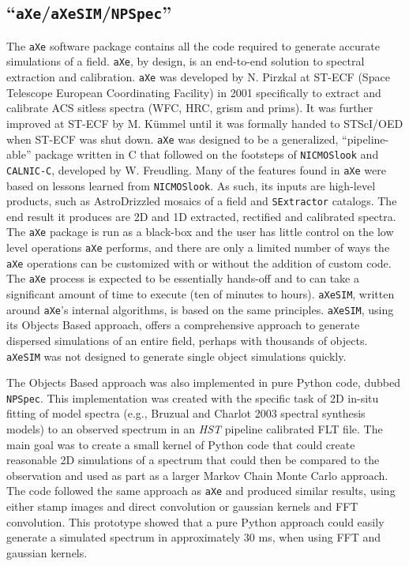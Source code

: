 \documentclass[preprint]{aastex}
\begin{document}
\subsection{``\texttt{aXe}/\texttt{aXeSIM}/\texttt{NPSpec}''} \label{sec:npspec}
The \texttt{aXe} software package contains all the code required to generate accurate simulations of a field. \texttt{aXe}, by design, is an end-to-end solution to spectral extraction and calibration. 
\texttt{aXe} was developed by N. Pirzkal at ST-ECF (Space Telescope European Coordinating Facility) in 2001 specifically to extract and calibrate ACS sitless spectra (WFC, HRC, grism and prims). It was further improved at ST-ECF by M. K\"{u}mmel until it was formally handed to STScI/OED  when ST-ECF was shut down. \texttt{aXe} was designed to be a generalized, ``pipeline-able'' package written in C that followed on the footsteps of \texttt{NICMOSlook} and \texttt{CALNIC-C}, developed by W. Freudling. Many of the features found in \texttt{aXe} were based on lessons learned from \texttt{NICMOSlook}.
As such, its inputs are high-level products, such as AstroDrizzled mosaics of a field and \texttt{SExtractor} catalogs. The end result it produces are 2D and 1D extracted, rectified and calibrated spectra. The \texttt{aXe} package is run as a black-box and the user has little control on the low level operations \texttt{aXe} performs, and there are only a limited number of ways the \texttt{aXe} operations can be customized with or without the addition of custom code. The \texttt{aXe} process is expected to be essentially hands-off and to can take a significant amount of time to execute (ten of minutes to hours).  \texttt{aXeSIM}, written around  \texttt{aXe}'s internal algorithms, is based on the same principles. \texttt{aXeSIM}, using its Objects Based approach, offers a comprehensive approach to generate dispersed simulations of an entire field, perhaps with thousands of objects.  \texttt{aXeSIM} was not designed to generate single object simulations quickly.

The Objects Based approach was also implemented in pure Python code, dubbed \texttt{NPSpec}. This implementation was created with the specific task of 2D in-situ fitting of model spectra (e.g., Bruzual and Charlot 2003 spectral synthesis models) to an observed spectrum in an \textit{HST} pipeline calibrated FLT file. The main goal was to create a small kernel of Python code that could create reasonable 2D simulations of a spectrum that could then be compared to the observation and used as part as a larger Markov Chain Monte Carlo approach. The code followed the same approach as \texttt{aXe} and produced similar results, using either stamp images and direct convolution or gaussian kernels and FFT convolution. This prototype showed that a pure Python approach could easily generate a simulated spectrum in approximately 30 ms, when using FFT and gaussian kernels.
\end{document}
